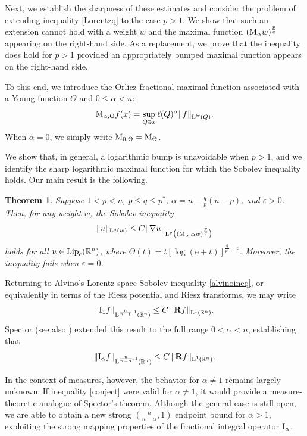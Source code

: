 \documentclass[11pt, a4paper, reqno]{amsart}
\newcommand{\R}{\mathbb R}
\newcommand{\Lup}{\textup{L}}
\newcommand{\Ldash}{\textup{\L}}
\DeclareMathOperator{\Lip}{\textup{Lip}}
\newtheorem{theorem}{Theorem}[section]
\theoremstyle{definition}
\theoremstyle{remark}
\begin{document}
Next, we establish the sharpness of these estimates and consider the problem of extending 
inequality \eqref{Lorentzq} to the case $p>1$. We show that such an extension cannot 
hold with a weight $w$ and the maximal function $(\textup{M}_\alpha w)^{\frac{p}{q}}$ appearing on the 
right-hand side. As a replacement, we prove that the inequality does hold for $p>1$ 
provided an appropriately bumped maximal function appears on the right-hand side. 

To this end, we introduce the Orlicz fractional maximal function associated with a Young function $\Theta$ and $0\le \alpha<n$:
\begin{equation}\label{OrliczMax}
\textup{M}_{\alpha,\Theta} f(x)
= \sup_{Q\ni x} \ell(Q)^{\alpha} \|f\|_{\Ldash^\Theta(Q)}.
\end{equation}
When $\alpha=0$, we simply write $\textup M_{0,\Theta} = \textup M_\Theta$. 

We show that, in general, a logarithmic bump is unavoidable when $p>1$, and we identify the sharp logarithmic 
maximal function for which the Sobolev inequality holds. Our main result is the following.


\begin{theorem}\label{bumpreplacep>1}
Suppose $1<p<n$, $p\le q\le p^*$, 
$\alpha=n-\frac{q}{p}(n-p)$, and $\varepsilon>0$. 
Then, for any weight $w$, the Sobolev inequality
\[
\|u\|_{\Lup^q(w)}\le C\|\nabla u\|_{\Lup^p\big((\textup{M}_{\alpha,\Theta}w)^{\frac{p}{q}}\big)}
\]
holds for all $u\in \Lip_c(\R^n)$, where $\Theta(t)=t[\log(\mathrm e+t)]^{\frac{q}{p'}+\varepsilon}.$
Moreover, the inequality fails when $\varepsilon=0$.
\end{theorem}

Returning to Alvino's Lorentz-space Sobolev inequality \eqref{alvinoineq}, or equivalently in terms of the Riesz potential and Riesz transforms, we may write
\[
\|\textup{I}_1 f\|_{\Lup^{\frac{n}{n-1},1}(\R^n)} \le C\,\|\mathbf R f\|_{\Lup^1(\R^n)}.
\]
Spector \cite{Spector} (see also \cite{SSVS}) extended this result to the full range $0<\alpha<n$, establishing that
\begin{equation}\label{spectorresult}
\|\textup{I}_\alpha f\|_{\Lup^{\frac{n}{n-\alpha},1}(\R^n)} \le C\,\|\mathbf R f\|_{\Lup^1(\R^n)}.
\end{equation}

In the context of measures, however, the behavior for $\alpha \neq 1$ remains largely unknown. If inequality \eqref{conject} were valid for $\alpha \neq 1$, it would provide a measure-theoretic analogue of Spector’s theorem. Although the general case is still open, we are able to obtain a new strong $(\tfrac{n}{n-\alpha},1)$ endpoint bound for $\alpha>1$, exploiting the strong mapping properties of the fractional integral operator $\textup{I}_\alpha$.
\end{document}
